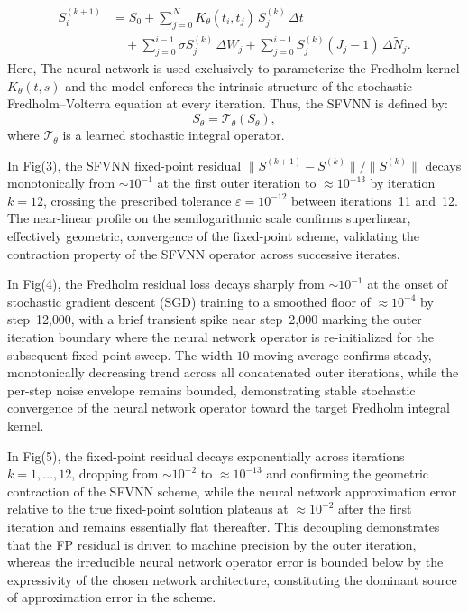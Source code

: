 \documentclass[preprint,12pt,authoryear]{elsarticle}
\begin{document}
\begin{align}
S_i^{(k+1)} &= S_0
+ \sum_{j=0}^{N} K_\theta(t_i,t_j)\,S_j^{(k)}\,\Delta t \\
&\quad + \sum_{j=0}^{i-1} \sigma S_j^{(k)}\,\Delta W_j
+ \sum_{j=0}^{i-1} S_j^{(k)}(J_j - 1)\,\Delta \tilde{N}_j.
\end{align}
Here, The neural network is used exclusively to parameterize the Fredholm kernel $K_\theta(t,s)$ and the model enforces the intrinsic structure of the stochastic Fredholm--Volterra equation at every iteration.
Thus, the SFVNN is defined by:
\begin{equation}
S_\theta = \mathcal{T}_\theta(S_\theta),
\end{equation}
where $\mathcal{T}_\theta$ is a learned stochastic integral operator.

In Fig(3), the SFVNN fixed-point residual $\|S^{(k+1)} - S^{(k)}\| / \|S^{(k)}\|$ decays
monotonically from $\sim\!10^{-1}$ at the first outer iteration to
$\approx 10^{-13}$ by iteration $k = 12$, crossing the prescribed tolerance
$\varepsilon = 10^{-12}$ between iterations~11 and~12. The near-linear profile
on the semilogarithmic scale confirms superlinear, effectively geometric,
convergence of the fixed-point scheme, validating the contraction property of the
SFVNN operator across successive iterates.

In Fig(4), the Fredholm residual loss decays sharply from $\sim\!10^{-1}$ at the onset of stochastic gradient descent (SGD) training to a smoothed floor of $\approx 10^{-4}$ by step~12{,}000, with a
brief transient spike near step~2{,}000 marking the outer iteration boundary
where the neural network operator is re-initialized for the subsequent fixed-point
sweep. The width-$10$ moving average  confirms steady,
monotonically decreasing trend across all concatenated outer iterations, while the
per-step noise envelope remains bounded, demonstrating stable stochastic
convergence of the neural network operator toward the target Fredholm integral
kernel.

In Fig(5), the fixed-point residual decays exponentially across iterations
$k = 1, \ldots, 12$, dropping from $\sim\!10^{-2}$ to $\approx 10^{-13}$ and
confirming the geometric contraction of the SFVNN scheme, while the neural
network approximation error relative to the true fixed-point solution plateaus at
$\approx 10^{-2}$ after the first iteration and remains essentially flat
thereafter. This decoupling demonstrates that the FP residual is driven to
machine precision by the outer iteration, whereas the irreducible neural network operator
error is bounded below by the expressivity of the chosen network architecture,
constituting the dominant source of approximation error in the scheme.
\end{document}
